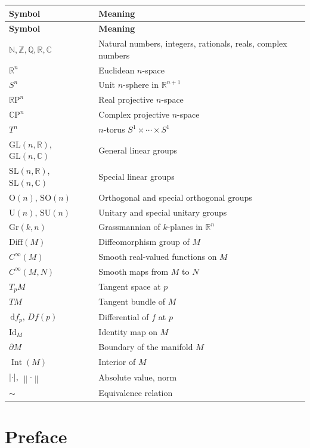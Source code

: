 \documentclass[12pt,a4paper,openany]{book}
\theoremstyle{definition}
\theoremstyle{remark}
\newcommand{\N}{\mathbb{N}}
\newcommand{\Z}{\mathbb{Z}}
\newcommand{\Q}{\mathbb{Q}}
\newcommand{\R}{\mathbb{R}}
\newcommand{\C}{\mathbb{C}}
\newcommand{\RP}{\mathbb{R}\mathrm{P}}
\newcommand{\CP}{\mathbb{C}\mathrm{P}}
\newcommand{\Id}{\mathrm{Id}}
\newcommand{\GL}{\mathrm{GL}}
\newcommand{\SL}{\mathrm{SL}}
\newcommand{\SO}{\mathrm{SO}}
\newcommand{\SU}{\mathrm{SU}}
\newcommand{\Orth}{\mathrm{O}}
\newcommand{\Uni}{\mathrm{U}}
\newcommand{\Diff}{\mathrm{Diff}}
\newcommand{\dd}{\,\mathrm{d}}
\newcommand{\abs}[1]{\left\lvert #1 \right\rvert}
\newcommand{\norm}[1]{\left\lVert #1 \right\rVert}
\newcommand{\rel}{\sim}
\newcommand{\Gr}{\mathrm{Gr}}
\begin{document}
\begin{longtable}{>{\raggedright}p{3.8cm} p{9.5cm}}
\toprule
\textbf{Symbol} & \textbf{Meaning} \\
\midrule
\endfirsthead
\toprule
\textbf{Symbol} & \textbf{Meaning} \\
\midrule
\endhead
\bottomrule
\endfoot
$\N, \Z, \Q, \R, \C$ & Natural numbers, integers, rationals, reals, complex numbers \\
$\R^n$ & Euclidean $n$-space \\
$S^n$ & Unit $n$-sphere in $\R^{n+1}$ \\
$\RP^n$ & Real projective $n$-space \\
$\CP^n$ & Complex projective $n$-space \\
$T^n$ & $n$-torus $S^1 \times \cdots \times S^1$ \\
$\GL(n,\R)$, $\GL(n,\C)$ & General linear groups \\
$\SL(n,\R)$, $\SL(n,\C)$ & Special linear groups \\
$\Orth(n)$, $\SO(n)$ & Orthogonal and special orthogonal groups \\
$\Uni(n)$, $\SU(n)$ & Unitary and special unitary groups \\
$\Gr(k,n)$ & Grassmannian of $k$-planes in $\R^n$ \\
$\Diff(M)$ & Diffeomorphism group of $M$ \\
$C^\infty(M)$ & Smooth real-valued functions on $M$ \\
$C^\infty(M,N)$ & Smooth maps from $M$ to $N$ \\
$T_pM$ & Tangent space at $p$ \\
$TM$ & Tangent bundle of $M$ \\
$\dd f_p$, $Df(p)$ & Differential of $f$ at $p$ \\
$\Id_M$ & Identity map on $M$ \\
$\partial M$ & Boundary of the manifold $M$ \\
$\operatorname{Int}(M)$ & Interior of $M$ \\
$\abs{\cdot}$, $\norm{\cdot}$ & Absolute value, norm \\
$\rel$ & Equivalence relation \\
\bottomrule
\end{longtable}


\chapter*{Preface}
\end{document}
